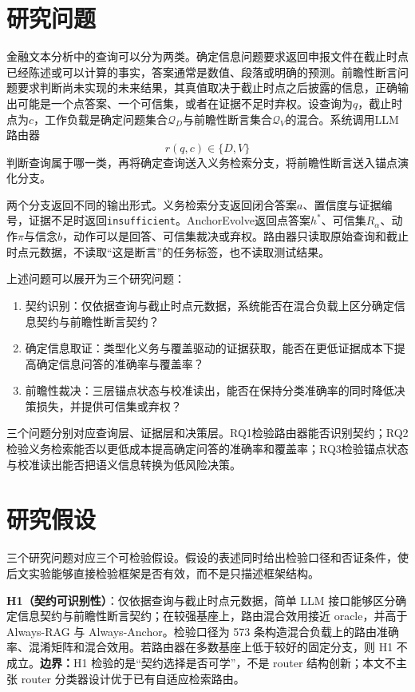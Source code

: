 \section{研究问题}

金融文本分析中的查询可以分为两类。确定信息问题要求返回申报文件在截止时点已经陈述或可以计算的事实，答案通常是数值、段落或明确的预测。前瞻性断言问题要求判断尚未实现的未来结果，其真值取决于截止时点之后披露的信息，正确输出可能是一个点答案、一个可信集，或者在证据不足时弃权。设查询为$q$，截止时点为$c$，工作负载是确定问题集合$\mathcal Q_D$与前瞻性断言集合$\mathcal Q_V$的混合。系统调用LLM路由器
\begin{equation}
r(q,c)\in\{D,V\}
\end{equation}
判断查询属于哪一类，再将确定查询送入义务检索分支，将前瞻性断言送入锚点演化分支。

两个分支返回不同的输出形式。义务检索分支返回闭合答案$a$、置信度与证据编号，证据不足时返回\texttt{insufficient}。AnchorEvolve返回点答案$h^*$、可信集$R_\alpha$、动作$\pi$与信念$b$，动作可以是回答、可信集裁决或弃权。路由器只读取原始查询和截止时点元数据，不读取“这是断言”的任务标签，也不读取测试结果。

上述问题可以展开为三个研究问题：
\begin{enumerate}[label=RQ\arabic*.,leftmargin=2em,itemsep=2pt,topsep=2pt]
\item 契约识别：仅依据查询与截止时点元数据，系统能否在混合负载上区分确定信息契约与前瞻性断言契约？
\item 确定信息取证：类型化义务与覆盖驱动的证据获取，能否在更低证据成本下提高确定信息问答的准确率与覆盖率？
\item 前瞻性裁决：三层锚点状态与校准读出，能否在保持分类准确率的同时降低决策损失，并提供可信集或弃权？
\end{enumerate}
三个问题分别对应查询层、证据层和决策层。RQ1检验路由器能否识别契约；RQ2检验义务检索能否以更低成本提高确定问答的准确率和覆盖率；RQ3检验锚点状态与校准读出能否把语义信息转换为低风险决策。

\section{研究假设}

三个研究问题对应三个可检验假设。假设的表述同时给出检验口径和否证条件，使后文实验能够直接检验框架是否有效，而不是只描述框架结构。

\begin{revbox}
\noindent\textbf{H1（契约可识别性）}：仅依据查询与截止时点元数据，简单 LLM 接口能够区分确定信息契约与前瞻性断言契约；在较强基座上，路由混合效用接近 oracle，并高于 Always-RAG 与 Always-Anchor。检验口径为 573 条构造混合负载上的路由准确率、混淆矩阵和混合效用。若路由器在多数基座上低于较好的固定分支，则 H1 不成立。\textbf{边界：}H1 检验的是“契约选择是否可学”，不是 router 结构创新；本文不主张 router 分类器设计优于已有自适应检索路由。
\end{revbox}

